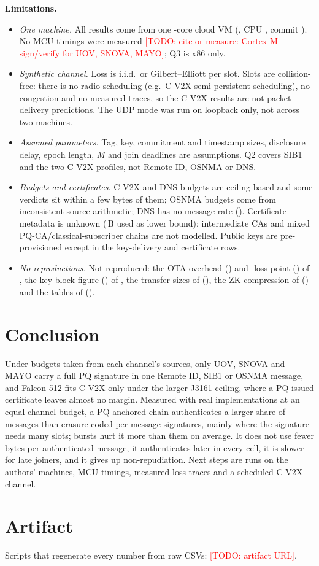 \documentclass[conference]{IEEEtran}
\newcommand{\todo}[1]{\textcolor{red}{[TODO: #1]}}
\begin{document}
\textbf{Limitations.}
\begin{itemize}
\item \emph{One machine.} All results come from one \RunCores-core cloud VM
  (\texttt{\RunMachine}, CPU \RunCPU, commit \texttt{\RunCommit}). No MCU
  timings were measured \todo{cite or measure: Cortex-M sign/verify for
  UOV, SNOVA, MAYO}; Q3 is x86 only.
\item \emph{Synthetic channel.} Loss is i.i.d.\ or Gilbert--Elliott per
  slot. Slots are collision-free: there is no radio scheduling (e.g.\ C-V2X
  semi-persistent scheduling), no congestion and no measured traces, so the
  C-V2X results are not packet-delivery predictions. The UDP mode was run
  on loopback only, not across two machines.
\item \emph{Assumed parameters.} Tag, key, commitment and timestamp sizes,
  disclosure delay, epoch length, $M$ and join deadlines are assumptions.
  Q2 covers SIB1 and the two C-V2X profiles, not Remote ID, OSNMA or DNS.
\item \emph{Budgets and certificates.} C-V2X and DNS budgets are
  ceiling-based and some verdicts sit within a few bytes of them; OSNMA
  budgets come from inconsistent source arithmetic; DNS has no message
  rate (\PerDNS). Certificate metadata is unknown (\CertMetaUsed\,B used as lower
  bound); intermediate CAs and mixed PQ-CA/classical-subscriber chains
  \cite{chen2026pseudonym} are not modelled. Public keys are
  pre-provisioned except in the key-delivery and certificate rows.
\item \emph{No reproductions.} Not reproduced: the OTA overhead
  (\DarziOTARepro) and \DarziLossPct-loss point (\DarziTenRepro) of
  \cite{darzi2026a}, the key-block figure (\JunqueraKeyRepro) of
  \cite{junquera2023assessment}, the transfer sizes of
  \cite{goertzen2022post} (\GoertzenRepro), the ZK compression of
  \cite{yoshizawa2026a} (\YoshizawaRepro) and the tables of
  \cite{chen2025hybrid} (\ChenRepro).
\end{itemize}

\section{Conclusion}

Under budgets taken from each channel's sources, only UOV, SNOVA and MAYO
carry a full PQ signature in one Remote ID, SIB1 or OSNMA message, and
Falcon-512 fits C-V2X only under the larger J3161 ceiling, where a
PQ-issued certificate leaves almost no margin. Measured with real
implementations at an equal channel budget, a PQ-anchored chain
authenticates a larger share of messages than erasure-coded per-message
signatures, mainly where the signature needs many slots; bursts hurt it
more than them on average. It does
not use fewer bytes per authenticated message, it authenticates later in
every cell, it is slower for late joiners, and it gives up
non-repudiation. Next steps are runs on the authors' machines, MCU
timings, measured loss traces and a scheduled C-V2X channel.

\section*{Artifact}
Scripts that regenerate every number from raw CSVs: \todo{artifact URL}.



\end{document}
